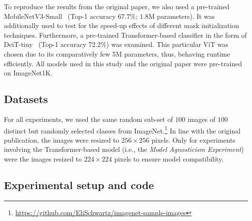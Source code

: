 To reproduce the results from the original paper, we also used a pre-trained MobileNetV3-Small~\cite{mobilenetv3} (Top-1 accuracy $67.7\%$; $1.8$M parameters).
It was additionally used to test for the speed-up effects of different mask initialization techniques.
Furthermore, a pre-trained Transformer-based classifier in the form of DeiT-tiny~\cite{efficientVisionTransformer} (Top-1 accuracy $72.2\%$) was examined.
This particular ViT was chosen due to its comparatively few 5M parameters, thus, behaving runtime efficiently.
All models used in this study and the original paper were pre-trained on ImageNet1K.





\subsection{Datasets}

For all experiments, we used the same random sub-set of $100$ images of $100$ distinct but randomly selected classes from ImageNet.\footnote{\url{https://github.com/EliSchwartz/imagenet-sample-images}}
In line with the original publication, the images were resized to $256 \times 256$ pixels. Only for experiments involving the Transformer-based model (i.e., the \textit{Model Agnosticism Experiment}) were the images resized to $224\times224$ pixels to ensure model compatibility.

\subsection{Experimental setup and code}

